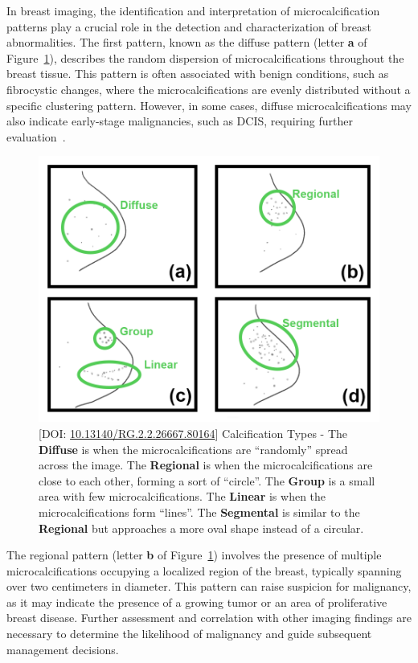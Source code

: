 In breast imaging, the identification and interpretation of microcalcification patterns play a crucial role in the detection and characterization of breast abnormalities.
The first pattern, known as the diffuse pattern (letter {\bf a} of Figure~\ref{fig:fig022}), describes the random dispersion of microcalcifications throughout the breast tissue.
This pattern is often associated with benign conditions, such as fibrocystic changes, where the microcalcifications are evenly distributed without a specific clustering pattern.
However, in some cases, diffuse microcalcifications may also indicate early-stage malignancies, such as \ac{DCIS}, requiring further evaluation~\cite{10.1093/jnci/djaa080}.

\begin{figure}[ht]
\centering
\includegraphics[width=\columnwidth]{images/fig022}
\caption{[DOI: \href{https://doi.org/10.13140/RG.2.2.26667.80164}{10.13140/RG.2.2.26667.80164}] Calcification Types - The {\bf Diffuse} is when the microcalcifications are ``randomly'' spread across the image. The {\bf Regional} is when the microcalcifications are close to each other, forming a sort of ``circle''. The {\bf Group} is a small area with few microcalcifications. The {\bf Linear} is when the microcalcifications form ``lines''. The {\bf Segmental} is similar to the {\bf Regional} but approaches a more oval shape instead of a circular.}
\label{fig:fig022}
\end{figure}

The regional pattern (letter {\bf b} of Figure~\ref{fig:fig022}) involves the presence of multiple microcalcifications occupying a localized region of the breast, typically spanning over two centimeters in diameter.
This pattern can raise suspicion for malignancy, as it may indicate the presence of a growing tumor or an area of proliferative breast disease.
Further assessment and correlation with other imaging findings are necessary to determine the likelihood of malignancy and guide subsequent management decisions.

